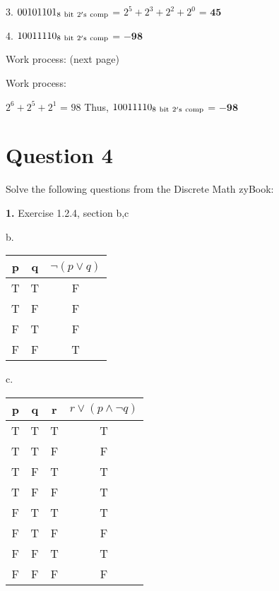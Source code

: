 \documentclass[11pt]{article}
\begin{document}
	3. $00101101_{\rm 8\ bit\ 2's\ comp}$ = $2^5+2^3+2^2+2^0$ = $\mathbf{45}$
	
	4. $10011110_{\rm 8\ bit\ 2's\ comp}$ = $\mathbf{-98}$
	
	Work process: (next page)
	
	Work process:
	\vspace{30mm}
	
	$2^6+2^5+2^1$ = $98$\hspace{3mm}
	Thus, $10011110_{\rm 8\ bit\ 2's\ comp}$ = $\mathbf{-98}$
	
	\newpage
	\section*{Question 4}
	Solve the following questions from the Discrete Math zyBook:
	
	\textbf{1.} Exercise 1.2.4, section b,c
	\medskip
	
	b. 
	\begin{center}
    \begin{tabular}{||c c c||} 
    \hline
    p & q &$ \neg (p\vee q)$ \\ [0.5ex] 
    \hline\hline
    T & T & F \\ 
    \hline
    T & F & F \\
    \hline
    F & T & F \\
    \hline
    F & F & T \\
    \hline
    \end{tabular}
    \end{center}
    
    c. 
	\begin{center}
    \begin{tabular}{||c c c c||} 
    \hline
    p & q & r & $r \vee (p\wedge \neg q)$ \\ [0.5ex] 
    \hline\hline
    T & T & T & T \\ 
    \hline
    T & T & F & F \\
    \hline
    T & F & T & T \\
    \hline
    T & F & F & T \\
    \hline
    F & T & T & T \\ 
    \hline
    F & T & F & F \\
    \hline
    F & F & T & T \\
    \hline
    F & F & F & F \\
    \hline
    \end{tabular}
    \end{center}
    
\end{document}
